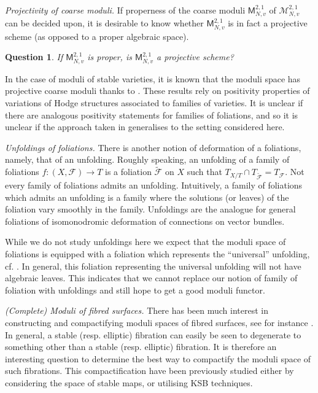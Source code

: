 \documentclass[12pt, a4paper]{amsart}
\newtheorem*{question}{Question}
\theoremstyle{definition}
\theoremstyle{named}
\begin{document}
{\it Projectivity of coarse moduli.}
If properness of the coarse moduli $\mathsf M^{2, 1}_{N, v}$ of $\mathcal M^{2, 1}_{N, v}$ can be decided upon, it is desirable to know whether $\mathsf M^{2, 1}_{N, v}$ is in fact a projective scheme (as opposed to a proper algebraic space).  
\begin{question}
If $\mathsf M^{2, 1}_{N, v}$ is proper, is $\mathsf M^{2, 1}_{N, v}$ a projective scheme?
\end{question}

In the case of moduli of stable varieties, it is known that the moduli space has projective coarse moduli thanks to \cite{KP17}.  These results rely on positivity properties of variations of Hodge structures associated to families of varieties.  It is unclear if there are analogous positivity statements for families of foliations, and so it is unclear if the approach taken in \cite{KP17} generalises to the setting considered here.





{\it Unfoldings of foliations.}
There is another notion of deformation of a foliations, namely, that of an unfolding.  
Roughly speaking, an unfolding of a family of foliations $f\colon (X, \mathcal F) \to T$ is a foliation $\widetilde{\mathcal F}$ on $X$ such that $T_{X/T} \cap T_{\widetilde{\mathcal F}} = T_{\mathcal F}$.  Not every family of foliations admits an unfolding.  Intuitively, a family of foliations which admits an unfolding is  a family where the solutions (or leaves) of the foliation vary smoothly in the family.  Unfoldings are the analogue for general foliations of isomonodromic deformation of connections on vector bundles.

While we do not study unfoldings here we expect that the moduli space of foliations is equipped with a foliation which represents the ``universal'' unfolding, cf. \cite{genzmer}.
In general, this foliation representing the universal unfolding will not have algebraic leaves.  This indicates that we cannot replace our notion of family of foliation with unfoldings 
and still hope to get a good moduli functor.

{\it (Complete) Moduli of fibred surfaces.}
There has been much interest in constructing and compactifying moduli spaces of fibred surfaces, 
see for instance \cite{Alexeev96, MR1862797, MR1849290, MR4621922, MR4137071, MR3961332, MR3985107}.
In general, a stable (resp. elliptic) fibration can easily be seen to degenerate to something other than a stable (resp. elliptic) fibration.  It is therefore an interesting question to determine the best way to compactify the moduli space of such fibrations.
This compactification have been previously studied either by considering the space of stable maps, or utilising KSB techniques.
\end{document}
